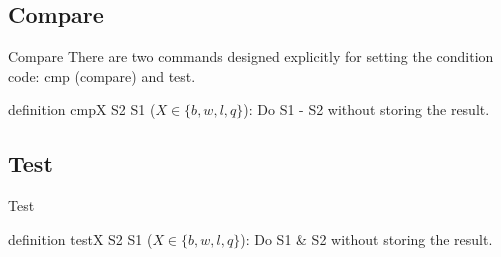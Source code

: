 \documentclass{beamer}
\newtheorem{rmk}{Remark}
\begin{document}
        \subsection{Compare}
        \begin{frame}{Compare}
            There are two commands designed explicitly for setting the condition code: cmp (compare) and test.
            \begin{block}{definition}
                cmpX S2 S1 ($X \in \{b, w, l, q\}$): Do S1 - S2 without storing the result.
            \end{block}
        \end{frame}
        \subsection{Test}
        \begin{frame}{Test}
            \begin{block}{definition}
                testX S2 S1 ($X \in \{b, w, l, q\}$): Do S1 \& S2 without storing the result.
            \end{block}
        \end{frame}
\end{document}
